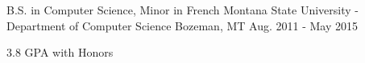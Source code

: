 

\begin{cventries}

  \cventry
    {B.S. in Computer Science, Minor in French} %
    {Montana State University - Department of Computer Science} %
    {Bozeman, MT} %
    {Aug. 2011 - May 2015} %
    {
      \begin{cvitems} %
        \item {3.8 GPA with Honors}
      \end{cvitems}
    }

\end{cventries}
